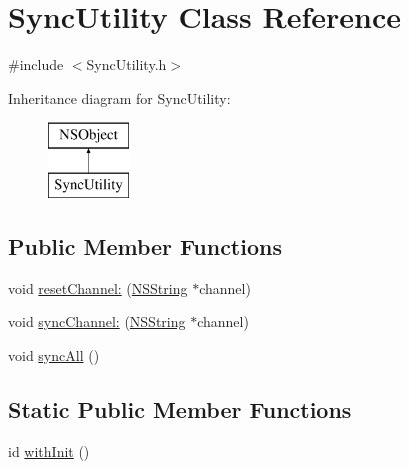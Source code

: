 \hypertarget{interface_sync_utility}{
\section{\-Sync\-Utility \-Class \-Reference}
\label{interface_sync_utility}
}


{\ttfamily \#include $<$\-Sync\-Utility.\-h$>$}

\-Inheritance diagram for \-Sync\-Utility\-:\begin{figure}[H]
\begin{center}
\leavevmode
\includegraphics[height=2.000000cm]{interface_sync_utility}
\end{center}
\end{figure}
\subsection*{\-Public \-Member \-Functions}
\begin{DoxyCompactItemize}
\item 
void \hyperlink{interface_sync_utility_a8bab208713f4e5dd221e6bbbc82dee1c}{reset\-Channel\-:} (\hyperlink{class_n_s_string}{\-N\-S\-String} $\ast$channel)
\item 
void \hyperlink{interface_sync_utility_af75dac0e51cb131bd02f992050147611}{sync\-Channel\-:} (\hyperlink{class_n_s_string}{\-N\-S\-String} $\ast$channel)
\item 
void \hyperlink{interface_sync_utility_a3dc655a5acdae2668c30bddf698b0c15}{sync\-All} ()
\end{DoxyCompactItemize}
\subsection*{\-Static \-Public \-Member \-Functions}
\begin{DoxyCompactItemize}
\item 
id \hyperlink{interface_sync_utility_ad26f93787ce5756818660a9bb9061d95}{with\-Init} ()
\end{DoxyCompactItemize}


